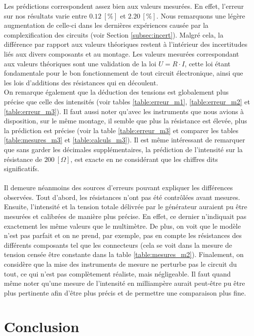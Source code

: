 \documentclass[11pt]{article}
\begin{document}
Les prédictions correspondent assez bien aux valeurs mesurées. En effet, l'erreur sur nos résultats varie entre $0.12 \ [\% ]$ et $2.20 \ [\% ]$. Nous remarquons une légère augmentation de celle-ci dans les dernières expériences causée par la complexification des circuits (voir Section \ref{subsec:incert}). Malgré cela, la différence par rapport aux valeurs théoriques restent à l'intérieur des incertitudes liés aux divers composants et au montage. Les valeurs mesurées correspondant aux valeurs théoriques sont une validation de la loi $U=R \cdot I$, cette loi étant fondamentale pour le bon fonctionnement de tout circuit électronique, ainsi que les lois d'additions des résistances qui en découlent.\\
On remarque également que la déduction des tensions est globalement plus précise que celle des intensités (voir tables \ref{table:erreur_m1}, \ref{table:erreur_m2} et \ref{table:erreur_m3}). Il faut aussi noter qu'avec les instruments que nous avions à disposition, sur le même montage, il semble que plus la résistance est élevée, plus la prédiction est précise (voir la table \ref{table:erreur_m3} et comparer les tables \ref{table:mesures_m3} et \ref{table:calculs_m3}). Il est même intéressant de remarquer que sans garder les décimales supplémentaires, la prédiction de l'intensité sur la résistance de $200 \ [\Omega]$, est exacte en ne considérant que les chiffres dits significatifs.\\\\
Il demeure néanmoins des sources d'erreurs pouvant expliquer les différences observées. Tout d'abord, les résistances n'ont pas été contrôlées avant mesures. Ensuite, l'intensité et la tension totale délivrée par le générateur auraient pu être mesurées et calibrées de manière plus précise. En effet, ce dernier n'indiquait pas exactement les même valeurs que le multimètre. De plus, on voit que le modèle n'est pas parfait et on ne prend, par exemple, pas en compte les résistances des différents composants tel que les connecteurs (cela se voit dans la mesure de tension censée être constante dans la table \ref{table:mesures_m2}). Finalement, on considère que la mise des instruments de mesure ne perturbe pas le circuit du tout, ce qui n'est pas complètement réaliste, mais négligeable. Il faut quand même noter qu'une mesure de l'intensité en milliampère aurait peut-être pu être plus pertinente afin d'être plus précis et de permettre une comparaison plus fine.

\section{Conclusion}
\end{document}
